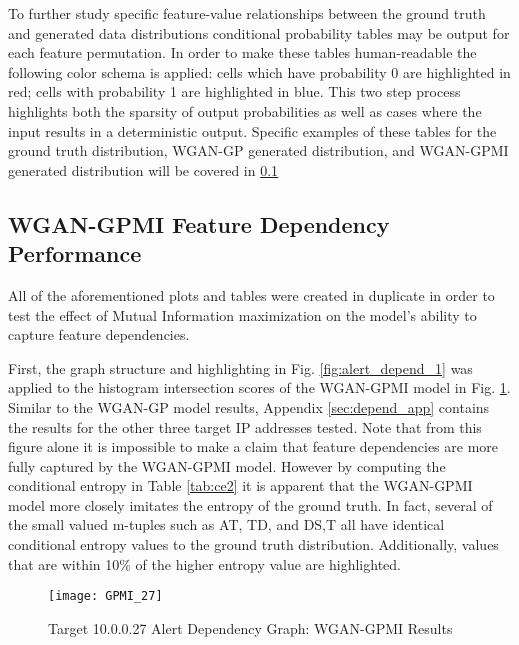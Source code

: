 To further study specific feature-value relationships between the ground truth and generated data distributions conditional probability tables may be output for each feature permutation. In order to make these tables human-readable the following color schema is applied: cells which have probability 0 are highlighted in red; cells with probability 1 are highlighted in blue. This two step process highlights both the sparsity of output probabilities as well as cases where the input results in a deterministic output. Specific examples of these tables for the ground truth distribution, WGAN-GP generated distribution, and WGAN-GPMI generated distribution will be covered in \ref{sec:gpmi_dep}

\subsection{WGAN-GPMI Feature Dependency Performance}
\label{sec:gpmi_dep}

All of the aforementioned plots and tables were created in duplicate in order to test the effect of Mutual Information maximization on the model's ability to capture feature dependencies.

First, the graph structure and highlighting in Fig. \ref{fig:alert_depend_1} was applied to the histogram intersection scores of the WGAN-GPMI model in Fig. \ref{fig:alert_depend_5}. Similar to the WGAN-GP model results, Appendix \ref{sec:depend_app} contains the results for the other three target IP addresses tested. Note that from this figure alone it is impossible to make a claim that feature dependencies are more fully captured by the WGAN-GPMI model. However by computing the conditional entropy in Table \ref{tab:ce2} it is apparent that the WGAN-GPMI model more closely imitates the entropy of the ground truth. In fact, several of the small valued m-tuples such as A{\given}T, T{\given}D, and D{\given}S,T all have identical conditional entropy values to the ground truth distribution. Additionally, values that are within 10\% of the higher entropy value are highlighted.  

\begin{figure}[!htbp]
	\centering
	\texttt{[image: GPMI\_27]}
	\caption{
		Target 10.0.0.27 Alert Dependency Graph: WGAN-GPMI Results
	}
	\label{fig:alert_depend_5}
\end{figure}

